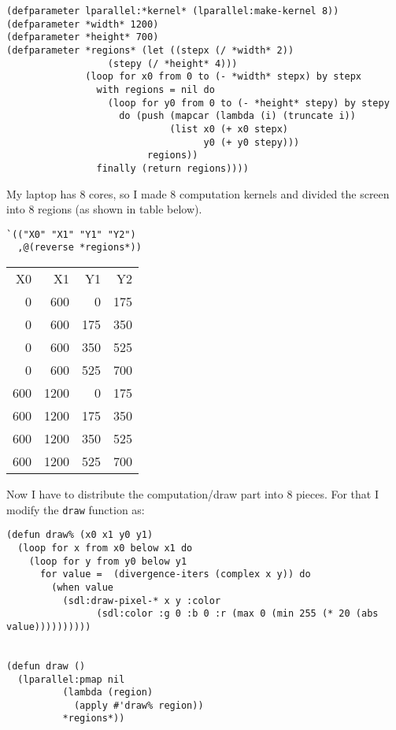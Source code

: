 \documentclass[11pt,a4paper]{article}
\begin{document}
\begin{lstlisting}
(defparameter lparallel:*kernel* (lparallel:make-kernel 8))
(defparameter *width* 1200)
(defparameter *height* 700)
(defparameter *regions* (let ((stepx (/ *width* 2))
			      (stepy (/ *height* 4)))
			  (loop for x0 from 0 to (- *width* stepx) by stepx
				with regions = nil do 
				  (loop for y0 from 0 to (- *height* stepy) by stepy
					do (push (mapcar (lambda (i) (truncate i))
							 (list x0 (+ x0 stepx)
							       y0 (+ y0 stepy)))
						 regions))
				finally (return regions))))
\end{lstlisting}

My laptop has 8 cores, so I made 8 computation kernels and divided the screen into 8 regions (as shown in table below). 
\begin{lstlisting}
`(("X0" "X1" "Y1" "Y2")
  ,@(reverse *regions*))
\end{lstlisting}

\begin{center}
\begin{tabular}{rrrr}
X0 & X1 & Y1 & Y2\\
0 & 600 & 0 & 175\\
0 & 600 & 175 & 350\\
0 & 600 & 350 & 525\\
0 & 600 & 525 & 700\\
600 & 1200 & 0 & 175\\
600 & 1200 & 175 & 350\\
600 & 1200 & 350 & 525\\
600 & 1200 & 525 & 700\\
\end{tabular}
\end{center}

Now I have to distribute the computation/draw part into 8 pieces. For that I modify the \texttt{draw} function as:
\begin{lstlisting}
(defun draw% (x0 x1 y0 y1) 
  (loop for x from x0 below x1 do
    (loop for y from y0 below y1 
	  for value =  (divergence-iters (complex x y)) do
	    (when value 
	      (sdl:draw-pixel-* x y :color
				(sdl:color :g 0 :b 0 :r (max 0 (min 255 (* 20 (abs value))))))))))


(defun draw ()
  (lparallel:pmap nil 
		  (lambda (region)
		    (apply #'draw% region))
		  *regions*))
\end{lstlisting}
\end{document}
